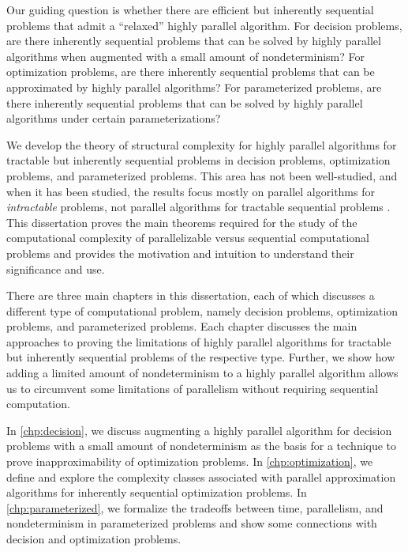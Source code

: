 Our guiding question is whether there are efficient but inherently sequential problems that admit a ``relaxed'' highly parallel algorithm.
For decision problems, are there inherently sequential problems that can be solved by highly parallel algorithms when augmented with a small amount of nondeterminism?
For optimization problems, are there inherently sequential problems that can be approximated by highly parallel algorithms?
For parameterized problems, are there inherently sequential problems that can be solved by highly parallel algorithms under certain parameterizations?

%
%
%
We develop the theory of structural complexity for highly parallel algorithms for tractable but inherently sequential problems in decision problems, optimization problems, and parameterized problems.
This area has not been well-studied, and when it has been studied, the results focus mostly on parallel algorithms for \emph{intractable} problems, %
not parallel algorithms for tractable sequential problems %
.
%
%
%
This dissertation proves the main theorems required for the study of the computational complexity of parallelizable versus sequential computational problems and provides the motivation and intuition to understand their significance and use.

%
%
%
%
There are three main chapters in this dissertation, each of which discusses a different type of computational problem, namely decision problems, optimization problems, and parameterized problems.
Each chapter discusses the main approaches to proving the limitations of highly parallel algorithms for tractable but inherently sequential problems of the respective type.
Further, we show how adding a limited amount of nondeterminism to a highly parallel algorithm allows us to circumvent some limitations of parallelism without requiring sequential computation.

In \autoref{chp:decision}, we discuss augmenting a highly parallel algorithm for decision problems with a small amount of nondeterminism as the basis for a technique to prove inapproximability of optimization problems.
In \autoref{chp:optimization}, we define and explore the complexity classes associated with parallel approximation algorithms for inherently sequential optimization problems.
In \autoref{chp:parameterized}, we formalize the tradeoffs between time, parallelism, and nondeterminism in parameterized problems and show some connections with decision and optimization problems.

